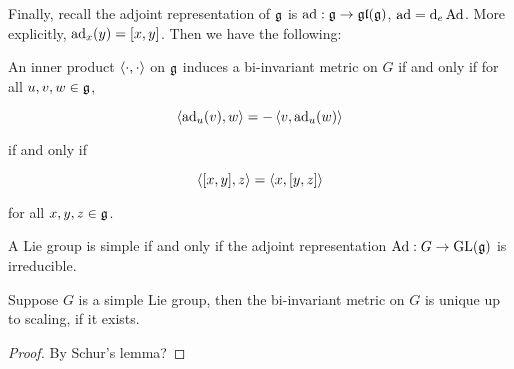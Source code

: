 \documentclass{article}
\begin{document}
Finally, recall the adjoint representation of \(\mathfrak{g}\) is \(\operatorname{ad} : \mathfrak{g} \to \mathfrak{g}\mathfrak{l}(\mathfrak{g})\), \(\operatorname{ad} = \dd_e \operatorname{Ad}\). More explicitly, \(\operatorname{ad}_x(y) = [x, y]\). Then we have the following:

\begin{proposition}
    An inner product \(\left\langle \cdot, \cdot \right\rangle\) on \(\mathfrak{g}\) induces a bi-invariant metric on \(G\) if and only if for all \(u, v, w \in \mathfrak{g}\),

    \[\left\langle \operatorname{ad}_u(v), w \right\rangle = -\left\langle v, \operatorname{ad}_u(w) \right\rangle\]

    if and only if

    \[\left\langle [x, y], z \right\rangle = \left\langle x, [y, z] \right\rangle\]

    for all \(x, y, z\in \mathfrak{g}\).
\end{proposition}

\begin{lemma}
    A Lie group is simple if and only if the adjoint representation \(\operatorname{Ad} : G \to \operatorname{GL}(\mathfrak{g})\) is irreducible.
\end{lemma}

\begin{proposition}
    Suppose \(G\) is a simple Lie group, then the bi-invariant metric on \(G\) is unique up to scaling, if it exists.
\end{proposition}

\begin{proof}
    By Schur's lemma?
\end{proof}
\end{document}

